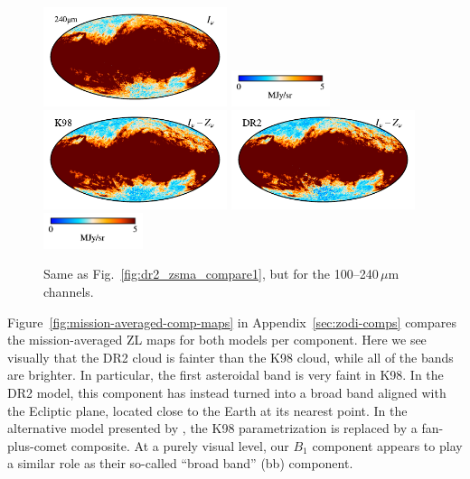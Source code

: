 \documentclass[twocolumn]{aa}
\begin{document}
\begin{figure}
    \includegraphics[height=2.90cm]{figs/compare_zsma/cosmoglobe_ma_10.pdf}%
    \includegraphics[width=2.90cm,angle=90]{figs/compare_zsma/cbar_tot_10.pdf}%
    \includegraphics[height=2.90cm]{figs/compare_zsma/dirbe_zsma_10.pdf}%
    \includegraphics[height=2.90cm]{figs/compare_zsma/cosmoglobe_zsma_10.pdf}%
    \includegraphics[width=2.90cm,angle=90]{figs/compare_zsma/cbar_10.pdf}%
      \\

      \caption{Same as Fig.~\ref{fig:dr2_zsma_compare1}, but for the 100--240$\,\mu$m channels. 
    }    
    \label{fig:dr2-zsma-compare2}
\end{figure}



Figure~\ref{fig:mission-averaged-comp-maps} in
Appendix~\ref{sec:zodi-comps} compares the mission-averaged ZL maps
for both models per component. Here we see visually that the DR2 cloud
is fainter than the K98 cloud, while all of the bands are brighter. 
In particular, the first asteroidal band is very faint in K98. In the DR2 model,
this component has instead turned into a broad band aligned with the
Ecliptic plane, located close to the Earth at its nearest
point. In the 
alternative model presented by \citet{Robinson2013}, the
K98 parametrization is replaced by a fan-plus-comet composite. At a
purely visual level, our $B_1$ component appears to play a similar
role as their so-called ``broad band'' (bb) component.
\end{document}
